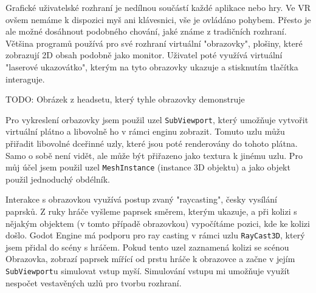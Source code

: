 Grafické uživatelské rozhraní je nedílnou součástí každé aplikace nebo hry. Ve VR ovšem nemáme k dispozici myš ani klávesnici, vše je ovládáno pohybem. Přesto je ale možné dosáhnout podobného chování, jaké známe z tradičních rozhraní. Většina programů používá pro své rozhraní virtuální "obrazovky", plošiny, které zobrazují 2D obsah podobně jako monitor. Uživatel poté využívá virtuální "laserové ukazovátko", kterým na tyto obrazovky ukazuje a stisknutím tlačítka interaguje.

TODO: Obrázek z headsetu, který tyhle obrazovky demonstruje

Pro vykreslení orbazovky jsem použil uzel \texttt{SubViewport}, který umožňuje vytvořit virtuální plátno a libovolně ho v rámci enginu zobrazit. Tomuto uzlu můžu přiřadit libovolné dceřinné uzly, které jsou poté renderovány do tohoto plátna. Samo o sobě není vidět, ale může být přiřazeno jako textura k jinému uzlu. Pro můj účel jsem použil uzel \texttt{MeshInstance} (instance 3D objektu) a jako objekt použil jednoduchý obdélník.

Interakce s obrazovkou využívá postup zvaný "raycasting", česky vysílání paprsků. Z ruky hráče vyšleme paprsek směrem, kterým ukazuje, a při kolizi s nějakým objektem (v tomto případě obrazovkou) vypočítáme pozici, kde ke kolizi došlo. Godot Engine má podporu pro ray casting v rámci uzlu \texttt{RayCast3D}, který jsem přidal do scény s hráčem. Pokud tento uzel zaznamená kolizi se scénou Obrazovka, zobrazí paprsek mířící od prstu hráče k obrazovce a začne v jejím \texttt{SubViewport}u simulovat vstup myší. Simulování vstupu mi umožňuje využít nespočet vestavěných uzlů pro tvorbu rozhraní.